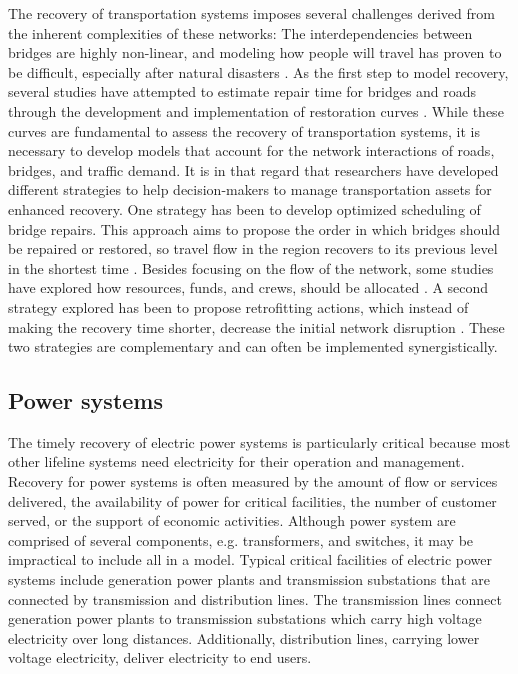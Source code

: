 The recovery of transportation systems imposes several challenges derived from the inherent complexities of these networks: The interdependencies between bridges are highly non-linear, and modeling how people will travel has proven to be difficult, especially after natural disasters \citep{chang2010transportation}. As the first step to model recovery, several studies have attempted to estimate repair time for bridges and roads through the development and implementation of restoration curves \cite{HAZUS-MH2015,padgett2007bridge}. While these curves are fundamental to assess the recovery of transportation systems, it is necessary to develop models that account for the network interactions of roads, bridges, and traffic demand. It is in that regard that researchers have developed different strategies to help decision-makers to manage transportation assets for enhanced recovery. One strategy has been to develop optimized scheduling of bridge repairs. This approach aims to propose the order in which bridges should be repaired or restored, so travel flow in the region recovers to its previous level in the shortest time \citep{vugrin2014optimal}. Besides focusing on the flow of the network, some studies have explored how resources, funds, and crews, should be allocated \citep{karlaftis2007fund}. A second strategy explored has been to propose retrofitting actions, which instead of making the recovery time shorter, decrease the initial network disruption \citep{zhang2016resilience}. These two strategies are complementary and can often be implemented synergistically.\ 

\subsection{Power systems}
The timely recovery of electric power systems is particularly critical because most other lifeline systems need electricity for their operation and management. Recovery for power systems is often measured by the amount of flow or services delivered, the availability of power for critical facilities, the number of customer served, or the support of economic activities. Although power system are comprised of several components, e.g. transformers, and switches, it may be impractical to include all in a model. Typical critical facilities of electric power systems include generation power plants and transmission substations that are connected by transmission and distribution lines. The transmission lines connect generation power plants to transmission substations which carry high voltage electricity over long distances. Additionally, distribution lines, carrying lower voltage electricity, deliver electricity to end users. \

